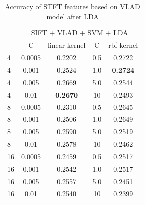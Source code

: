 \documentclass[conference]{IEEEtran}
\begin{document}
\begin{table}[htbp]
	\centering
	\newcommand{\tabincell}[2]{\begin{tabular}{@{}#1@{}}#2\end{tabular}}
	\renewcommand\arraystretch{1.0}
	\caption{Accuracy of STFT features based on VLAD model after LDA}
	\label{base2}%
	\begin{tabular}{@{}p{1cm}<{\centering}|c|c|c|c}
		\hline
		\multirow{2}{*}{\diagbox[height=2\line,width=1.42cm,font=\tiny]{$k$}{Acc.}{$\mathit{M}$}} &
		\multicolumn{4}{c}{SIFT + VLAD + SVM + LDA}\\
		\cline{2-5}
		& {C} & {linear kernel} & {C} & {rbf kernel}\\
		\hline
		4   & 0.0005  & 0.2202 & 0.5 & 0.2722\\
		4   & 0.001  & 0.2524 & 1.0 & \textbf{0.2724}\\
		4   & 0.005  & 0.2669 & 5.0 & 0.2544\\
        4   & 0.01  & \textbf{0.2670} & 10 & 0.2493\\
        \hline
		8   & 0.0005 &0.2310 & 0.5 & 0.2645\\
		8   & 0.001 & 0.2506 & 1.0 & 0.2649\\
		8   & 0.005 & 0.2590 & 5.0 & 0.2519\\
        8   & 0.01  & 0.2578 & 10 & 0.2462\\
        \hline
		16   & 0.0005  & 0.2459 & 0.5 & 0.2517\\
		16   & 0.001  & 0.2542 & 1.0 & 0.2517\\
		16   & 0.005  & 0.2557 & 5.0 & 0.2451\\
		16   & 0.01  & 0.2540 & 10 & 0.2399\\
		\hline
	\end{tabular}
\end{table}
\end{document}
